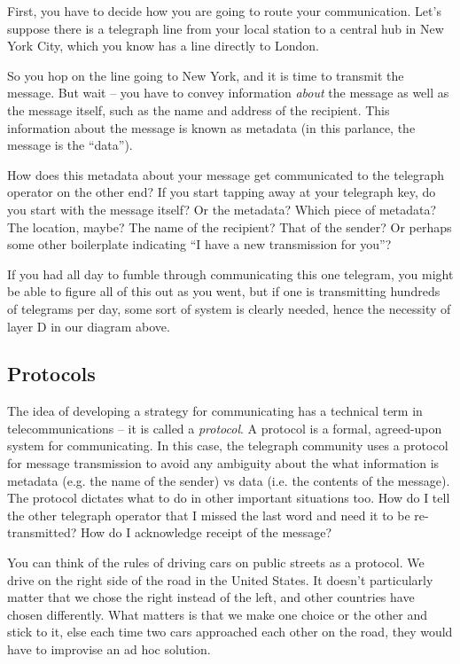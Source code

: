 \documentclass[UTF8]{book}
\begin{document}
\begin{CJK}{UTF8}{gbsn}
First, you have to decide how you are going to route your communication. Let's suppose there is a telegraph line from your local station to a central hub in New York City, which you know has a line directly to London.

So you hop on the line going to New York, and it is time to transmit the message. But wait -- you have to convey information \emph{about} the message as well as the message itself, such as the name and address of the recipient. This information about the message is known as metadata (in this parlance, the message is the ``data'').

How does this metadata about your message get communicated to the telegraph operator on the other end? If you start tapping away at your telegraph key, do you start with the message itself? Or the metadata? Which piece of metadata? The location, maybe? The name of the recipient? That of the sender? Or perhaps some other boilerplate indicating ``I have a new transmission for you''?

If you had all day to fumble through communicating this one telegram, you might be able to figure all of this out as you went, but if one is transmitting hundreds of telegrams per day, some sort of system is clearly needed, hence the necessity of layer D in our diagram above.

\subsection{Protocols}

The idea of developing a strategy for communicating has a technical term in telecommunications -- it is called a \emph{protocol}. A protocol is a formal, agreed-upon system for communicating. In this case, the telegraph community uses a protocol for message transmission to avoid any ambiguity about the what information is metadata (e.g. the name of the sender) vs data (i.e. the contents of the message). The protocol dictates what to do in other important situations too. How do I tell the other telegraph operator that I missed the last word and need it to be re-transmitted? How do I acknowledge receipt of the message?

You can think of the rules of driving cars on public streets as a protocol. We drive on the right side of the road in the United States. It doesn't particularly matter that we chose the right instead of the left, and other countries have chosen differently. What matters is that we make one choice or the other and stick to it, else each time two cars approached each other on the road, they would have to improvise an ad hoc solution.


\end{CJK}
\end{document}
